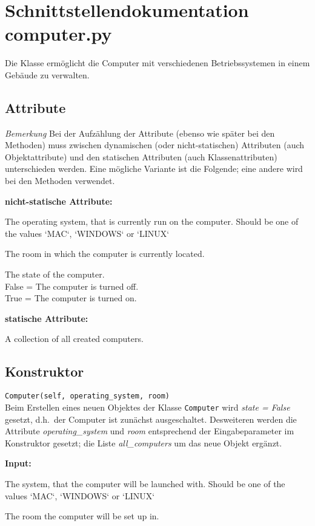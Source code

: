 \documentclass[smallheadings]{scrartcl}
\newcommand{\initem}[2]{\item[\hspace{0.5em} {\normalfont\ttfamily{#1}} {\normalfont\itshape{(#2)}}]}
\newcommand{\bfpara}[1]{
	
	\noindent \textbf{#1:}\,}
\begin{document}
\section{Schnittstellendokumentation computer.py}


Die Klasse erm\"oglicht die Computer mit verschiedenen Betriebssystemen in einem Geb\"aude zu verwalten. 
\subsection{Attribute}
\textit{Bemerkung} Bei der Aufz\"ahlung der Attribute (ebenso wie sp\"ater bei den Methoden) muss zwischen dynamischen (oder nicht-statischen) Attributen (auch Objektattribute) und den statischen Attributen (auch Klassenattributen) unterschieden werden. Eine m\"ogliche Variante ist die Folgende; eine andere wird bei den Methoden verwendet.
\bfpara{nicht-statische Attribute}
\begin{compactdesc}
	\initem{sys}{string} The operating system, that is currently run on the computer.
                      Should be one of the values `MAC`, `WINDOWS` or `LINUX`
	      \initem{room}{int} The room in which the computer is currently located.
	      \initem{state}{bool} The state of the computer.\\
                      False = The computer is turned off.\\
                      True = The computer is turned on.
\end{compactdesc}
\bfpara{statische Attribute}
\begin{compactdesc}
	\initem{all\_computers}{list of computers} A collection of all created computers.
\end{compactdesc}
\subsection{Konstruktor}
\texttt{Computer(self, operating\_system, room)}\\
 Beim Erstellen eines neuen Objektes der Klasse \texttt{Computer} wird \textit{state = False} gesetzt, d.h.\ der Computer ist zun\"achst ausgeschaltet. Desweiteren werden die Attribute \textit{operating\_system} und \textit{room} entsprechend der Eingabeparameter im Konstruktor gesetzt; die Liste \textit{all\_computers} um das neue Objekt erg\"anzt.

\bfpara{Input}
	    \begin{compactdesc}
		    \initem{operating\_system}{string} The system, that the computer will be launched with.
                                       Should be one of the values `MAC`, `WINDOWS` or `LINUX`
		   \initem{room}{int} The room the computer will be set up in.
	    \end{compactdesc}
\end{document}
